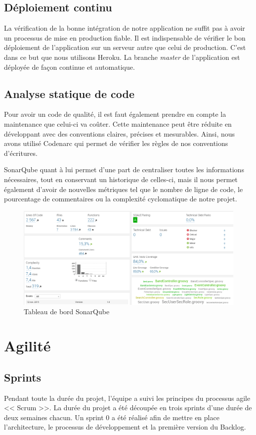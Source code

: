 \documentclass[12pt,a4paper,oneside]{book}
\begin{document}
	\section{Déploiement continu}
	La vérification de la bonne intégration de notre application ne suffit pas à avoir un processus de mise en production fiable. Il est indispensable de vérifier le bon déploiement de l'application sur un serveur autre que celui de production. C'est dans ce but que nous utilisons Heroku. La branche\textit{ master }de l'application est déployée de façon continue et automatique.
	
	\section{Analyse statique de code}
	Pour avoir un code de qualité, il est faut également prendre en compte la maintenance que celui-ci va coûter. Cette maintenance peut être réduite en développant avec des conventions
	claires, précises et mesurables. 
	Ainsi, nous avons utilisé Codenarc qui permet de vérifier les règles de nos conventions d’écritures. 
	
	SonarQube quant à lui permet d’une part de centraliser toutes les informations nécessaires, tout en conservant un historique de celles-ci, mais il nous permet également d’avoir de nouvelles
	métriques tel que le nombre de ligne de code, le pourcentage de commentaires ou la complexité cyclomatique de notre projet. 

	\begin{figure}[H]
		\centering
		\includegraphics[width=18cm]{../beamer/images/Results/methodo/sonar.png}
		\caption{Tableau de bord SonarQube}
	\end{figure}
	
	\chapter{Agilité}
	\section{Sprints}	
	Pendant toute la durée du projet, l’équipe a suivi les principes du processus agile << Scrum >>. La durée du projet a été découpée en trois sprints d’une durée de deux semaines chacun. Un sprint 0 a été réalisé afin de mettre en place l’architecture, le processus de développement et la première version du Backlog.
	
\end{document}
